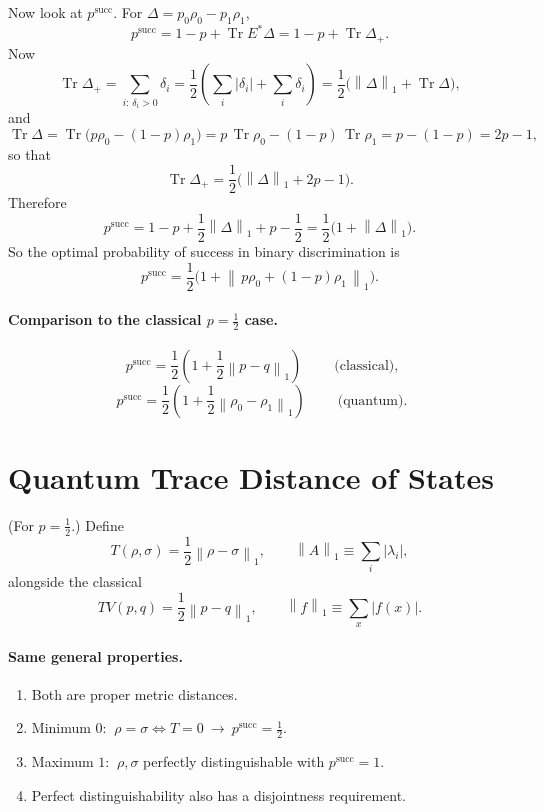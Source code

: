 \documentclass[11pt]{article}
\newcommand{\Tr}{\operatorname{Tr}}
\newcommand{\onenorm}[1]{\left\lVert #1 \right\rVert_{1}}
\begin{document}
Now look at $p^{\mathrm{succ}}$. For $\Delta = p_0\rho_0 - p_1\rho_1$,
\[
p^{\mathrm{succ}} = 1-p + \Tr E^{*}\Delta = 1-p + \Tr\Delta_{+}.
\]
Now
\[
\Tr\Delta_{+} = \sum_{i:\,\delta_i>0}\delta_i
= \frac12\!\left(\sum_i|\delta_i| + \sum_i\delta_i\right)
= \frac12\big(\onenorm{\Delta} + \Tr\Delta\big),
\]
and
\[
\Tr\Delta = \Tr\big(p\rho_0 - (1-p)\rho_1\big)
= p\,\Tr\rho_0 - (1-p)\,\Tr\rho_1
= p - (1-p) = 2p-1,
\]
so that
\[
\Tr\Delta_{+} = \frac12\big(\onenorm{\Delta} + 2p-1\big).
\]
Therefore
\[
p^{\mathrm{succ}}
= 1-p + \frac12\onenorm{\Delta} + p - \frac12
= \frac12\big(1 + \onenorm{\Delta}\big).
\]
So the optimal probability of success in binary discrimination is
\[
\boxed{\;
p^{\mathrm{succ}} = \frac12\Big(1 + \onenorm{\,p\rho_0 + (1-p)\rho_1\,}\Big).
\;}
\]

\paragraph{Comparison to the classical $p=\tfrac12$ case.}
\[
\boxed{\;
p^{\mathrm{succ}} = \frac12\!\left(1 + \frac12\onenorm{p-q}\right)
\;}
\qquad\text{(classical),}
\]
\[
\boxed{\;
p^{\mathrm{succ}} = \frac12\!\left(1 + \frac12\onenorm{\rho_0-\rho_1}\right)
\;}
\qquad\text{(quantum).}
\]

\section{Quantum Trace Distance of States}

(For $p=\tfrac12$.) Define
\[
T(\rho,\sigma) = \frac12\onenorm{\rho-\sigma},
\qquad \onenorm{A}\equiv\sum_i|\lambda_i|,
\]
alongside the classical
\[
TV(p,q) = \frac12\onenorm{p-q},
\qquad \onenorm{f}\equiv\sum_x|f(x)|.
\]

\paragraph{Same general properties.}
\begin{enumerate}[label=\textbf{\arabic*.}, leftmargin=*]
  \item Both are proper metric distances.
  \item Minimum $0$: $\ \rho=\sigma \iff T=0 \ \rightarrow\ p^{\mathrm{succ}}=\tfrac12$.
  \item Maximum $1$: $\ \rho,\sigma$ perfectly distinguishable with
        $p^{\mathrm{succ}}=1$.
  \item Perfect distinguishability also has a disjointness requirement.
\end{enumerate}
\end{document}
